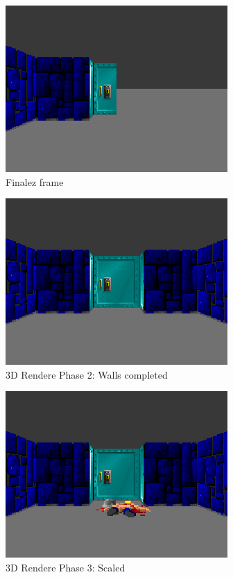 \documentclass[book.tex]{subfiles}
\begin{document}
\begin{figure}[H]
 \centering
  \includegraphics[scale=1.3]{screenshots/wolf3d_5_partialwalls_160rays.png}
 \caption{Finalez frame} 
 \label{fig:mips}
\end{figure}
 
 
 \begin{figure}[H]
\centering
 \includegraphics[scale=1.3]{screenshots/wolf4d_2_walls.png}
 \caption{3D Rendere Phase 2: Walls completed} \label{fig:mips}
 \end{figure}
 
 
 \begin{figure}[H]
\centering
 \includegraphics[scale=1.3]{screenshots/wolf3d_6_scaled}
 \caption{3D Rendere Phase 3: Scaled} \label{fig:mips}
 \end{figure}
\end{document}
